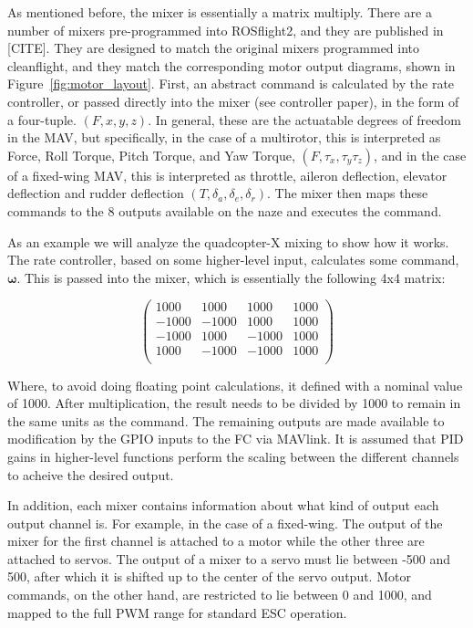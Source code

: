 \documentclass[paper=a4, fontsize=11pt]{scrartcl} %
\begin{document}
As mentioned before, the mixer is essentially a matrix multiply.  There are a number of mixers pre-programmed into ROSflight2, and they are published in [CITE].  They are designed to match the original mixers programmed into cleanflight, and they match the corresponding motor output diagrams, shown in Figure~\ref{fig:motor_layout}. First, an abstract command is calculated by the rate controller, or passed directly into the mixer (see controller paper), in the form of a four-tuple.  $(F, x, y, z)$.  In general, these are the actuatable degrees of freedom in the MAV, but specifically, in the case of a multirotor, this is interpreted as Force, Roll Torque, Pitch Torque, and Yaw Torque, $(F, \tau_x, \tau_y \tau_z)$, and in the case of a fixed-wing MAV, this is interpreted as throttle, aileron deflection, elevator deflection and rudder deflection $(T, \delta_a, \delta_e, \delta_r)$.  The mixer then maps these commands to the 8 outputs available on the naze and executes the command.

As an example we will analyze the quadcopter-X mixing to show how it works.  The rate controller, based on some higher-level input, calculates some command, $\bm{\omega}$.  This is passed into the mixer, which is essentially the following 4x4 matrix:

\begin{equation}
	\begin{pmatrix}
		 1000 & 1000 & 1000 & 1000 \\
	  -1000 &-1000 & 1000 & 1000 \\
	  -1000 & 1000 &-1000 & 1000 \\
	   1000 &-1000 &-1000 & 1000 \\
	\end{pmatrix}
\end{equation}

Where, to avoid doing floating point calculations, it defined with a nominal value of 1000.  After multiplication, the result needs to be divided by 1000 to remain in the same units as the command.  The remaining outputs are made available to modification by the GPIO inputs to the FC via MAVlink.  It is assumed that PID gains in higher-level functions perform the scaling between the different channels to acheive the desired output.

In addition, each mixer contains information about what kind of output each output channel is.  For example, in the case of a fixed-wing.  The output of the mixer for the first channel is attached to a motor while the other three are attached to servos.  The output of a mixer to a servo must lie between -500 and 500, after which it is shifted up to the center of the servo output.  Motor commands, on the other hand, are restricted to lie between 0 and 1000, and mapped to the full PWM range for standard ESC operation.
\end{document}
